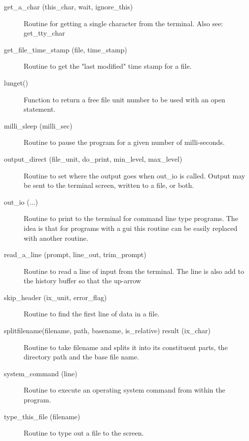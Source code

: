 \begin{description}
\label{r:get.a.char}
\item[get_a_char (this_char, wait, ignore_this)] \Newline 
Routine for getting a single character from the terminal.
Also see: get_tty_char

\label{r:get.file.time.stamp}
\item[get_file_time_stamp (file, time_stamp)] \Newline 
Routine to get the "last modified" time stamp for a file.

\label{r:lunget}
\item[lunget()] \Newline 
Function to return a free file unit number to be used with an open statement.

\label{r:milli.sleep}
\item[milli_sleep (milli_sec)] \Newline 
Routine to pause the program for a given number of milli-seconds.

\label{r:output.direct}
\item[output_direct (file_unit, do_print, min_level, max_level)] \Newline 
Routine to set where the output goes when out_io is called.
Output may be sent to the terminal screen, written to a file, or both.

\label{r:out.io}
\item[out_io (...)] \Newline 
Routine to print to the terminal for command line type programs.
The idea is that for programs with a gui this routine can be easily
replaced with another routine.

\label{r:read.a.line}
\item[read_a_line (prompt, line_out, trim_prompt)] \Newline 
Routine to read a line of input from the terminal.
The line is also add to the history buffer so that the up-arrow

\label{r:skip.header}
\item[skip_header (ix_unit, error_flag)] \Newline 
Routine to find the first line of data in a file. 

\label{r:splitfilename}
\item[splitfilename(filename, path, basename, is_relative) result (ix_char)] \Newline 
Routine to take filename and splits it into its constituent parts, 
the directory path and the base file name.  

\label{r:system.command}
\item[system_command (line)] \Newline 
Routine to execute an operating system command from within the program.

\label{r:type.this.file}
\item[type_this_file (filename)] \Newline 
Routine to type out a file to the screen.

\end{description}

